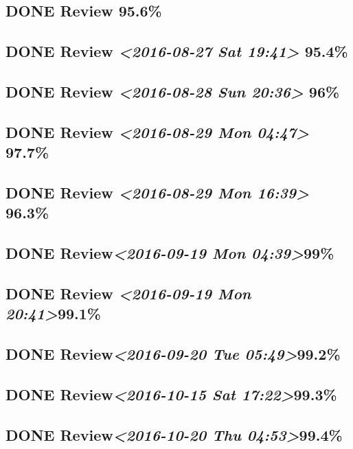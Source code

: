 \documentclass[11pt]{ctexart}
\begin{document}
\subsection{{\bfseries\sffamily DONE} Review 95.6\%}
\label{sec:orgb7f30a2}
\subsection{{\bfseries\sffamily DONE} Review \textit{<2016-08-27 Sat 19:41> } 95.4\%}
\label{sec:org32a3dbb}
\subsection{{\bfseries\sffamily DONE} Review \textit{<2016-08-28 Sun 20:36> } 96\%}
\label{sec:org4c9b6bb}
\subsection{{\bfseries\sffamily DONE} Review \textit{<2016-08-29 Mon 04:47> } 97.7\%}
\label{sec:orgdfca2e6}
\subsection{{\bfseries\sffamily DONE} Review \textit{<2016-08-29 Mon 16:39> } 96.3\%}
\label{sec:org7ad624e}
\subsection{{\bfseries\sffamily DONE} Review\textit{<2016-09-19 Mon 04:39>}99\%}
\label{sec:orgdd84f21}
\subsection{{\bfseries\sffamily DONE} Review \textit{<2016-09-19 Mon 20:41>}99.1\%}
\label{sec:orgaff7cdc}
\subsection{{\bfseries\sffamily DONE} Review\textit{<2016-09-20 Tue 05:49>}99.2\%}
\label{sec:org2c8eed6}
\subsection{{\bfseries\sffamily DONE} Review\textit{<2016-10-15 Sat 17:22>}99.3\%}
\label{sec:org7337c5c}
\subsection{{\bfseries\sffamily DONE} Review\textit{<2016-10-20 Thu 04:53>}99.4\%}
\label{sec:orgac3804c}
\end{document}
